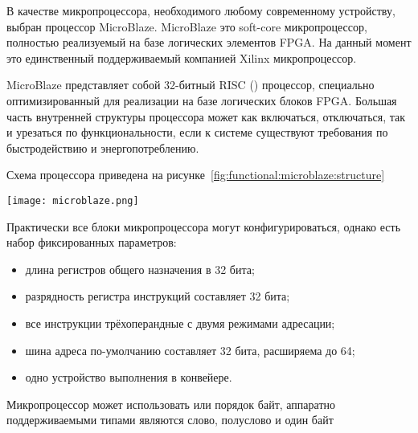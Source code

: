 В качестве микропроцессора, необходимого любому современному устройству, выбран процессор MicroBlaze.
MicroBlaze это soft-core микропроцессор, полностью реализуемый на базе логических элементов FPGA.
На данный момент это единственный поддерживаемый компанией Xilinx микропроцессор.

MicroBlaze представляет собой 32-битный RISC () процессор,
специально оптимизированный для реализации на базе логических блоков FPGA. Большая
часть внутренней структуры процессора может как включаться, отключаться, так и урезаться
по функциональности, если к системе существуют требования по быстродействию и энергопотреблению.

Схема процессора приведена на рисунке~\ref{fig:functional:microblaze:structure}

\begin{center}
  \centering
  \texttt{[image: microblaze.png]}
  \label{fig:functional:microblaze:structure}
\end{center}

Практически все блоки микропроцессора могут конфигурироваться, однако есть набор фиксированных
параметров:
\begin{itemize}
  \item длина регистров общего назначения в 32 бита;
  \item разрядность регистра инструкций составляет 32 бита;
  \item все инструкции трёхоперандные с двумя режимами адресации;
  \item шина адреса по-умолчанию составляет 32 бита, расширяема до 64;
  \item одно устройство выполнения в конвейере.
\end{itemize}

Микропроцессор может использовать  или  порядок байт,
аппаратно поддерживаемыми типами являются слово, полуслово и один байт

